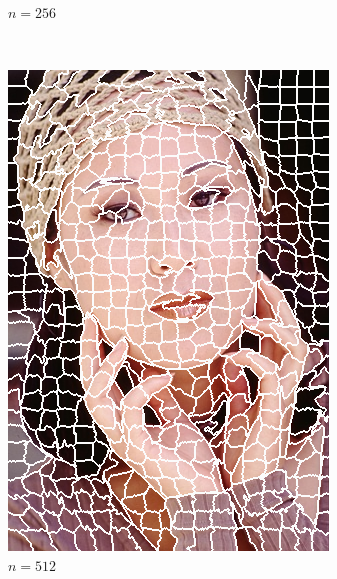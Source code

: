 \documentclass[12pt]{article}
\begin{document}
\begin{figure}
\begin{subfigure}{0.48\textwidth}
    \caption{$n=256$}
  \end{subfigure} \\
  \begin{subfigure}{0.48\textwidth}
    \centering
    \includegraphics[width=.8\textwidth]{lady/lady_segmented_512.png}
    \caption{$n=512$}
  \end{subfigure}
  \begin{subfigure}{0.48\textwidth}
    \centering

\end{subfigure}
\end{figure}
\end{document}
